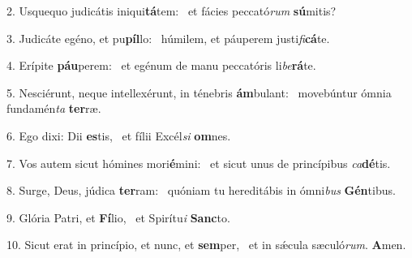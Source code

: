 2. Usquequo judicátis iniqui\textbf{tá}tem: \ast\  et fácies peccató\textit{rum} \textbf{sú}mitis?\

3. Judicáte egéno, et pu\textbf{píl}lo: \ast\  húmilem, et páuperem justi\textit{fi}\textbf{cá}te.\

4. Erípite \textbf{páu}perem: \ast\  et egénum de manu peccatóris li\textit{be}\textbf{rá}te.\

5. Nesciérunt, neque intellexérunt, in ténebris \textbf{ám}bulant: \ast\  movebúntur ómnia fundamén\textit{ta} \textbf{ter}ræ.\

6. Ego dixi: Dii \textbf{es}tis, \ast\  et fílii Excél\textit{si} \textbf{om}nes.\

7. Vos autem sicut hómines mori\textbf{é}mini: \ast\  et sicut unus de princípibus \textit{ca}\textbf{dé}tis.\

8. Surge, Deus, júdica \textbf{ter}ram: \ast\  quóniam tu hereditábis in ómni\textit{bus} \textbf{Gén}tibus.\

9. Glória Patri, et \textbf{Fí}lio, \ast\  et Spirítu\textit{i} \textbf{Sanc}to.\

10. Sicut erat in princípio, et nunc, et \textbf{sem}per, \ast\  et in sǽcula sæculó\textit{rum}. \textbf{A}men.\

